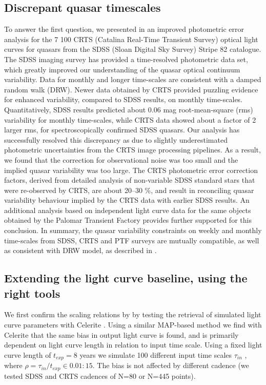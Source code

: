 \documentclass[modern]{aastex62}
\begin{document}
\subsection{Discrepant quasar timescales}
To answer the first question, we presented in \cite{suberlak2017} an improved photometric error analysis for the 7 100 CRTS (Catalina Real-Time Transient Survey) optical light curves for quasars from the SDSS (Sloan Digital Sky Survey) Stripe 82 catalogue. The SDSS imaging survey has provided a time-resolved photometric data set, which greatly improved our understanding of the quasar optical continuum variability. Data for monthly and longer time-scales are consistent with a damped random walk (DRW). Newer data obtained by CRTS provided puzzling evidence for enhanced variability, compared to SDSS results, on monthly time-scales. Quantitatively, SDSS results predicted about 0.06 mag root-mean-square (rms) variability for monthly time-scales, while CRTS data showed about a factor of 2 larger rms, for spectroscopically confirmed SDSS quasars. Our analysis has successfully resolved this discrepancy as due to slightly underestimated photometric uncertainties from the CRTS image processing pipelines. As a result, we found that the correction for observational noise was too small and the implied quasar variability was too large. The CRTS photometric error correction factors, derived from detailed analysis of non-variable SDSS standard stars that were re-observed by CRTS, are about 20–30 \%, and result in reconciling quasar variability behaviour implied by the CRTS data with earlier SDSS results. An additional analysis based on independent light curve data for the same objects obtained by the Palomar Transient Factory provides further supported for this conclusion. In summary, the quasar variability constraints on weekly and monthly time-scales from SDSS, CRTS and PTF surveys are mutually compatible, as well as consistent with DRW model, as described in \citep{suberlak2017}. 



\subsection{Extending the light curve baseline, using the right tools}
We first confirm the scaling relations by \cite{kozlowski2017a} by testing the retrieval of simulated light curve parameters with Celerite .  Using a similar MAP-based method we find with Celerite that the same bias in output light curve is found, and is primarily dependent on light curve length in relation to input time scale. Using a fixed light curve length of $t_{exp} = 8$ years we simulate 100 different input time scales $\tau_{in}$ ,  where  $\rho = \tau_{in} / t_{exp} \in   { 0.01 : 15}$.  The bias is not affected by different cadence (we tested SDSS and CRTS cadences of N=80 or N=445 points).
\end{document}
